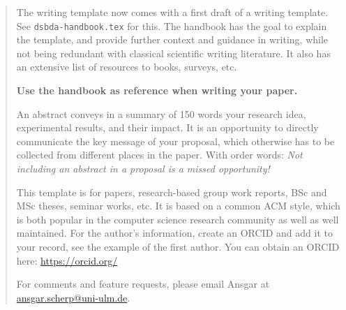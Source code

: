 \documentclass[sigconf, review, nonacm]{acmart}
\begin{document}
\author{Julius P. Kumquat}

\renewcommand{\shortauthors}{Trovato and Tobin, et al.}

\begin{abstract}

\begin{tcolorbox}[title=A handbook is born!,colback=red!20]

The writing template now comes with a first draft of a writing template. 
See \texttt{dsbda-handbook.tex} for this.
The handbook has the goal to explain the template, and provide further context and guidance in writing, while not being redundant with classical scientific writing literature.
It also has an extensive list of resources to books, surveys, etc.

\textbf{Use the handbook as reference when writing your paper.}
\end{tcolorbox}

\begin{tcolorbox}[title=Abstract: How to write it]
An abstract conveys in a summary of 150 words your research idea, experimental results, and their impact. It is an opportunity to directly communicate the key message of your proposal, which otherwise has to be collected from different places in the paper. With order words: \textit{Not including an abstract in a proposal is a missed opportunity!}
\end{tcolorbox}

This template is for papers, research-based group work reports, BSc and MSc theses, seminar works, etc. 
It is based on a common ACM style, which is both popular in the computer science research community as well as well maintained.
%
For the author's information, create an ORCID and add it to your record, see the example of the first author.
You can obtain an ORCID here: \url{https://orcid.org/}


For comments and feature requests, please email Ansgar at
\href{mailto:ansgar.scherp@uni-ulm.de?subject=DSBDA-TemplateForPaper-Annotated}{ansgar.scherp@uni-ulm.de}.


\end{abstract}
\end{document}
